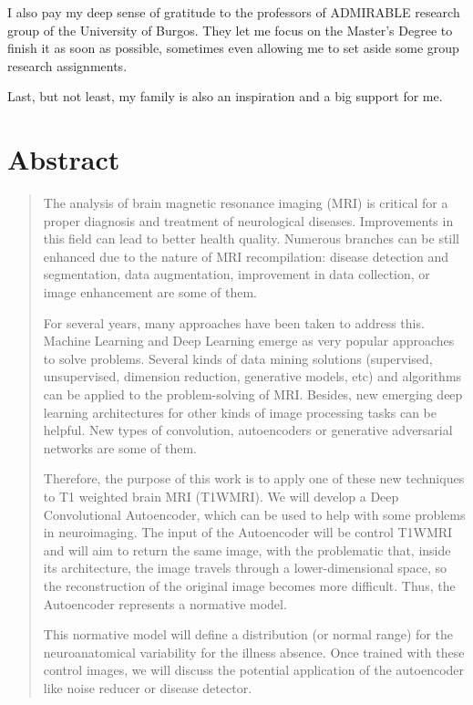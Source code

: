 I also pay my deep sense of gratitude to the professors of ADMIRABLE research group of the University of Burgos. They let me focus on the Master's Degree to finish it as soon as possible, sometimes even allowing me to set aside some group research assignments.

Last, but not least, my family is also an inspiration and a big support for me.

\clearpage

\chapter*{\centering Abstract}

\onehalfspacing

\begin{quote}
{The analysis of brain magnetic resonance imaging (MRI) is critical for a proper diagnosis and treatment of neurological diseases. Improvements in this field can lead to better health quality. Numerous branches can be still enhanced due to the nature of MRI recompilation: disease detection and segmentation, data augmentation, improvement in data collection, or image enhancement are some of them.

For several years, many approaches have been taken to address this. Machine Learning and Deep Learning emerge as very popular approaches to solve problems. Several kinds of data mining solutions (supervised, unsupervised, dimension reduction, generative models, etc) and algorithms can be applied to the problem-solving of MRI. Besides, new emerging deep learning architectures for other kinds of image processing tasks can be helpful. New types of convolution, autoencoders or generative adversarial networks are some of them.

Therefore, the purpose of this work is to apply one of these new techniques to T1 weighted brain MRI (T1WMRI). We will develop a Deep Convolutional Autoencoder, which can be used to help with some problems in neuroimaging. The input of the Autoencoder will be control T1WMRI and will aim to return the same image, with the problematic that, inside its architecture, the image travels through a lower-dimensional space, so the reconstruction of the original image becomes more difficult. Thus, the Autoencoder represents a normative model.

This normative model will define a distribution (or normal range) for the neuroanatomical variability for the illness absence. Once trained with these control images, we will discuss the potential application of the autoencoder like noise reducer or disease detector.}
\end{quote}


